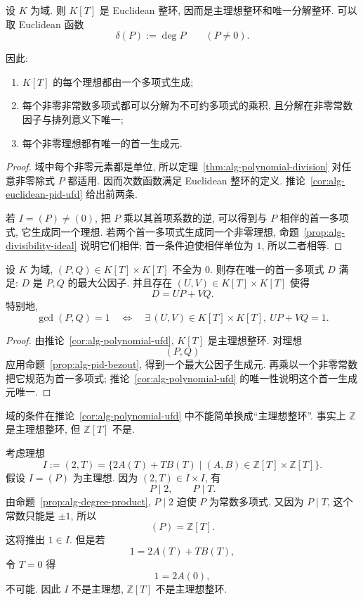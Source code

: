 \documentclass[usesamecnt, thmcnt=section, lang=cn, newtx, 10pt, scheme=chinese]{elegantbook}
\begin{document}
\begin{corollary}\label{cor:alg-polynomial-ufd}
设 $K$ 为域. 则 $K[T]$ 是 Euclidean 整环, 因而是主理想整环和唯一分解整环. 可以取 Euclidean 函数
\[
 \delta(P):=\deg P
 \qquad(P\neq0).
\]

因此:
\begin{enumerate}[label=\rm(\arabic*)]
  \item $K[T]$ 的每个理想都由一个多项式生成;
  \item 每个非零非常数多项式都可以分解为不可约多项式的乘积, 且分解在非零常数因子与排列意义下唯一;
  \item 每个非零理想都有唯一的首一生成元.
\end{enumerate}
\end{corollary}

\begin{proof}
域中每个非零元素都是单位, 所以定理~\ref{thm:alg-polynomial-division} 对任意非零除式 $P$ 都适用. 因而次数函数满足 Euclidean 整环的定义. 推论~\ref{cor:alg-euclidean-pid-ufd} 给出前两条.

若 $I=(P)\neq(0)$, 把 $P$ 乘以其首项系数的逆, 可以得到与 $P$ 相伴的首一多项式, 它生成同一个理想. 若两个首一多项式生成同一个非零理想, 命题~\ref{prop:alg-divisibility-ideal} 说明它们相伴; 首一条件迫使相伴单位为 $1$, 所以二者相等.
\end{proof}

\begin{corollary}\label{cor:alg-polynomial-bezout}
设 $K$ 为域, $(P,Q)\in K[T]\times K[T]$ 不全为 $0$. 则存在唯一的首一多项式 $D$ 满足: $D$ 是 $P,Q$ 的最大公因子. 并且存在 $(U,V)\in K[T]\times K[T]$ 使得
\[
 D=UP+VQ.
\]
特别地,
\[
 \gcd(P,Q)=1
 \quad\Longleftrightarrow\quad
 \exists\,(U,V)\in K[T]\times K[T],\ UP+VQ=1.
\]
\end{corollary}

\begin{proof}
由推论~\ref{cor:alg-polynomial-ufd}, $K[T]$ 是主理想整环. 对理想
\[
 (P,Q)
\]
应用命题~\ref{prop:alg-pid-bezout}, 得到一个最大公因子生成元. 再乘以一个非零常数把它规范为首一多项式; 推论~\ref{cor:alg-polynomial-ufd} 的唯一性说明这个首一生成元唯一.
\end{proof}

\begin{instance}\label{ins:alg-ZT-not-pid}
域的条件在推论~\ref{cor:alg-polynomial-ufd} 中不能简单换成``主理想整环''. 事实上 $\mathbb Z$ 是主理想整环, 但 $\mathbb Z[T]$ 不是.

考虑理想
\[
 I:=(2,T)
 =\{2A(T)+T B(T)\mid (A,B)\in\mathbb Z[T]\times\mathbb Z[T]\}.
\]
假设 $I=(P)$ 为主理想. 因为 $(2,T)\in I\times I$, 有
\[
 P\mid2,
 \qquad
 P\mid T.
\]
由命题~\ref{prop:alg-degree-product}, $P\mid2$ 迫使 $P$ 为常数多项式. 又因为 $P\mid T$, 这个常数只能是 $\pm1$, 所以
\[
 (P)=\mathbb Z[T].
\]
这将推出 $1\in I$. 但是若
\[
 1=2A(T)+TB(T),
\]
令 $T=0$ 得
\[
 1=2A(0),
\]
不可能. 因此 $I$ 不是主理想, $\mathbb Z[T]$ 不是主理想整环.
\end{instance}
\end{document}
